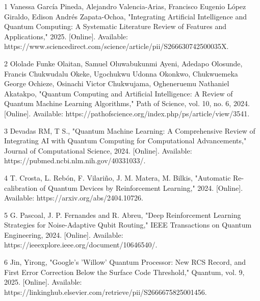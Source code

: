 \documentclass[11pt,a4paper,oneside]{report}
\begin{document}
	
	
	
	
	
	
	
	\tableofcontents
	\newpage
	\listoffigures
	\newpage
	
	
	
	
	
	
	
	
	
	
	
	\footnotesize
	\renewcommand\bibname{References}
	\begin{thebibliography}{}
		\item[1] Vanessa García Pineda, Alejandro Valencia-Arias, Francisco Eugenio López Giraldo, Edison Andrés Zapata-Ochoa, "Integrating Artificial Intelligence and Quantum Computing: A Systematic Literature Review of Features and Applications," 2025. [Online]. Available: https://www.sciencedirect.com/science/article/pii/S266630742500035X.  
		
		\item[2] Ololade Funke Olaitan, Samuel Oluwabukunmi Ayeni, Adedapo Olosunde, Francis Chukwudalu Okeke, Ugochukwu Udonna Okonkwo, Chukwuemeka George Ochieze, Osinachi Victor Chukwujama, Ogheneruemu Nathaniel Akatakpo, "Quantum Computing and Artificial Intelligence: A Review of Quantum Machine Learning Algorithms," Path of Science, vol. 10, no. 6, 2024. [Online]. Available: https://pathofscience.org/index.php/ps/article/view/3541.  
		
		\item[3] Devadas RM, T S., "Quantum Machine Learning: A Comprehensive Review of Integrating AI with Quantum Computing for Computational Advancements," Journal of Computational Science, 2024. [Online]. Available: https://pubmed.ncbi.nlm.nih.gov/40331033/.  
		
		\item[4] T. Crosta, L. Rebón, F. Vilariño, J. M. Matera, M. Bilkis, "Automatic Re-calibration of Quantum Devices by Reinforcement Learning," 2024. [Online]. Available: https://arxiv.org/abs/2404.10726.  
		
		\item[5] G. Pascoal, J. P. Fernandes and R. Abreu, "Deep Reinforcement Learning Strategies for Noise-Adaptive Qubit Routing," IEEE Transactions on Quantum Engineering, 2024. [Online]. Available: https://ieeexplore.ieee.org/document/10646540/.  
		
		\item[6] Jin, Yirong, "Google's 'Willow' Quantum Processor: New RCS Record, and First Error Correction Below the Surface Code Threshold," Quantum, vol. 9, 2025. [Online]. Available: https://linkinghub.elsevier.com/retrieve/pii/S2666675825001456.  
		

\end{thebibliography}
\end{document}
